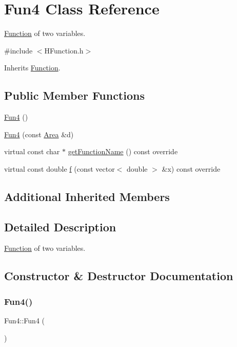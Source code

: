 \hypertarget{class_fun4}{}\section{Fun4 Class Reference}
\label{class_fun4}


\hyperlink{class_function}{Function} of two variables.  




{\ttfamily \#include $<$H\+Function.\+h$>$}



Inherits \hyperlink{class_function}{Function}.

\subsection*{Public Member Functions}
\begin{DoxyCompactItemize}
\item 
\hyperlink{class_fun4_a94f0f97a5083d2da8730ab40149e1556}{Fun4} ()
\item 
\hyperlink{class_fun4_a604acbf431d2ac044090349ef5f6d174}{Fun4} (const \hyperlink{class_area}{Area} \&d)
\item 
virtual const char $\ast$ \hyperlink{class_fun4_a7d4a9da6240876674244784c79184772}{get\+Function\+Name} () const override
\item 
virtual const double \hyperlink{class_fun4_a6d02fcaf80b0baa15b2828afb19dee12}{f} (const vector$<$ double $>$ \&x) const override
\end{DoxyCompactItemize}
\subsection*{Additional Inherited Members}


\subsection{Detailed Description}
\hyperlink{class_function}{Function} of two variables. 

\subsection{Constructor \& Destructor Documentation}
\mbox{\label{class_fun4_a94f0f97a5083d2da8730ab40149e1556}} 
\subsubsection{\texorpdfstring{Fun4()}{Fun4()}\hspace{0.1cm}{\footnotesize\ttfamily [1/2]}}
{\footnotesize\ttfamily Fun4\+::\+Fun4 (\begin{DoxyParamCaption}{ }\end{DoxyParamCaption})}

